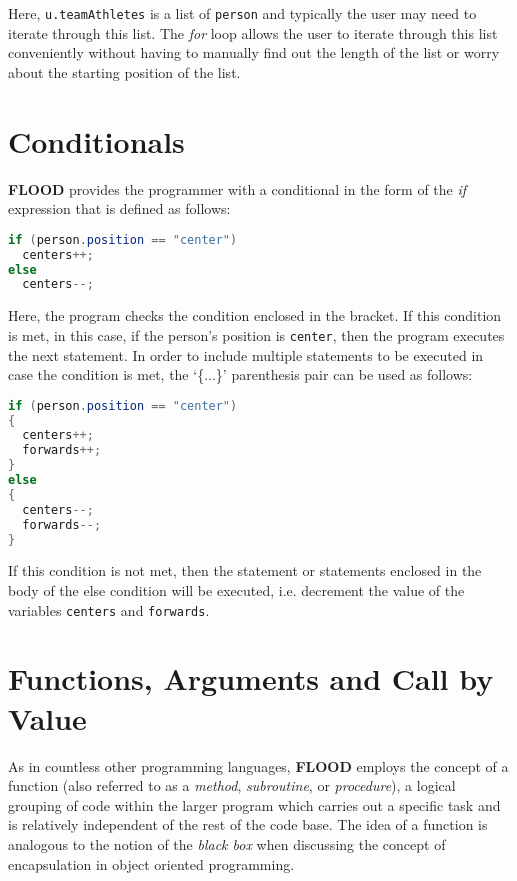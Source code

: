 \documentclass[12pt]{report}
\begin{document}
Here, \texttt{u.teamAthletes} is a list of \texttt{person} and typically the user may need to iterate through this list. The \textit{for} loop allows the user to iterate through this list conveniently without having to manually find out the length of the list or worry about the starting position of the list.

\section{Conditionals}

\textbf{FLOOD} provides the programmer with a conditional in the form of the \textit{if} expression that is defined as follows:

\begin{singlespace}
\begin{lstlisting}[language=Java,label=some-code,caption=if conditional]
if (person.position == "center")
  centers++;
else
  centers--;
\end{lstlisting}
\end{singlespace}

Here, the program checks the condition enclosed in the bracket. If this condition is met, in this case, if the person's position is \texttt{center}, then the program executes the next statement. In order to include multiple statements to be executed in case the condition is met, the `\{$\ldots$\}'
parenthesis pair can be used as follows:

\begin{singlespace}
\begin{lstlisting}[language=Java,label=some-code,caption=Bracketed conditionals]
if (person.position == "center")
{
  centers++;
  forwards++;
}
else
{
  centers--;
  forwards--;
}
\end{lstlisting}
\end{singlespace}

If this condition is not met, then the statement or statements enclosed in the body of the else condition will be executed, i.e. decrement the value of the variables \texttt{centers} and \texttt{forwards}.

\section{Functions, Arguments and Call by Value}

As in countless other programming languages, \textbf{FLOOD} employs the concept of a function (also referred to as a \textit{method}, \textit{subroutine}, or \textit{procedure}), a logical grouping of code within the larger program which carries out a specific task and is relatively independent of the rest of the code base. The idea of a function is analogous to the notion of the \textit{black box} when discussing the concept of encapsulation in object oriented programming. 
\end{document}
